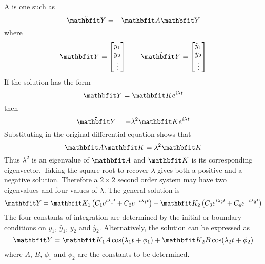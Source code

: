 A  is one such as
$$\ddot{\vect{Y}}=-\vect{A}\vect{Y}$$
where
$$\vect{Y}=\begin{bmatrix}y_1\\y_2\\\vdots\end{bmatrix}\qquad
\ddot{\vect{Y}}=\begin{bmatrix}\ddot{y}_1\\\ddot{y}_2\\\vdots\end{bmatrix}$$
If the solution has the form
$$\vect{Y}=\vect{K}e^{i\lambda t}$$
then
$$\ddot{\vect{Y}}=-\lambda^2\vect{K}e^{i\lambda t}$$
Substituting in the original differential equation shows that
$$\vect{A}\vect{K}=\lambda^2\vect{K}$$
Thus $\lambda^2$ is an eigenvalue of $\vect{A}$ and $\vect{K}$ is its
corresponding eigenvector.  Taking the square root to recover $\lambda$
gives both a positive and a negative solution.  Therefore a $2\times 2$
second order system may have two eigenvalues and four values of $\lambda$.
The general solution is
$$\vect{Y}=\vect{K}_1\left(C_1e^{i\lambda_1t}+C_2e^{-i\lambda_1t}\right)
+\vect{K}_2\left(C_3e^{i\lambda_2t}+C_4e^{-i\lambda_2t}\right)$$
The four constants of integration are determined by the initial or boundary
conditions on $y_1$, $\dot{y_1}$, $y_2$ and $\dot{y_2}$.  Alternatively, the
solution can be expressed as
$$\vect{Y}=\vect{K}_1A\cos(\lambda_1t+\phi_1)+\vect{K}_2B\cos(\lambda_2t
+\phi_2)$$
where $A$, $B$, $\phi_1$ and $\phi_2$ are the constants to be determined.

